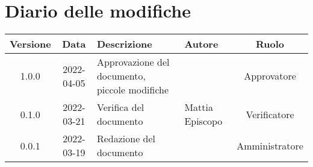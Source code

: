 \section*{Diario delle modifiche}
	\begin{center}
	\renewcommand{\arraystretch}{1.8} %
	\begin{tabular}{ |c|c|m{12em}|m{7em}|c| }
		\hline
		\textbf{Versione} & \textbf{Data} & \textbf{Descrizione} &  \textbf{Autore} &  \textbf{Ruolo} \\
		\hline
		1.0.0 & 2022-04-05 & Approvazione del documento, piccole modifiche & \docApprovazione & Approvatore\\
		\hline
		0.1.0 & 2022-03-21 & Verifica del documento & Mattia \newline Episcopo & Verificatore\\
		\hline
		0.0.1 & 2022-03-19 & Redazione del documento & \docRedattori & Amministratore\\
		\hline
	\end{tabular}
	\end{center}
	\newpage